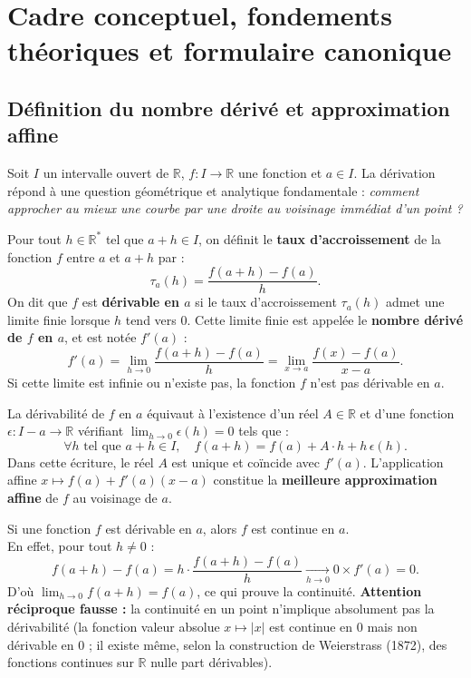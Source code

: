 \documentclass[11pt,a4paper]{article}
\newcommand{\R}{\mathbb{R}}
\begin{document}
\section{Cadre conceptuel, fondements théoriques et formulaire canonique}

\subsection{Définition du nombre dérivé et approximation affine}

Soit $I$ un intervalle ouvert de $\R$, $f : I \to \R$ une fonction et $a \in I$.
La dérivation répond à une question géométrique et analytique fondamentale : \emph{comment approcher au mieux une courbe par une droite au voisinage immédiat d'un point ?}

\begin{theoremebox}
Pour tout $h \in \R^*$ tel que $a+h \in I$, on définit le \textbf{taux d'accroissement} de la fonction $f$ entre $a$ et $a+h$ par :
\[
\tau_a(h) = \frac{f(a+h) - f(a)}{h}.
\]
On dit que $f$ est \textbf{dérivable en $a$} si le taux d'accroissement $\tau_a(h)$ admet une limite finie lorsque $h$ tend vers $0$.
Cette limite finie est appelée le \textbf{nombre dérivé de $f$ en $a$}, et est notée $f'(a)$ :
\[
f'(a) = \lim_{h \to 0} \frac{f(a+h) - f(a)}{h} = \lim_{x \to a} \frac{f(x) - f(a)}{x - a}.
\]
Si cette limite est infinie ou n'existe pas, la fonction $f$ n'est pas dérivable en $a$.
\end{theoremebox}

\begin{theoremebox}
La dérivabilité de $f$ en $a$ équivaut à l'existence d'un réel $A \in \R$ et d'une fonction $\epsilon : I - a \to \R$ vérifiant $\lim_{h \to 0} \epsilon(h) = 0$ tels que :
\[
\forall h \text{ tel que } a+h \in I, \quad f(a+h) = f(a) + A \cdot h + h\,\epsilon(h).
\]
Dans cette écriture, le réel $A$ est unique et coïncide avec $f'(a)$.
L'application affine $x \mapsto f(a) + f'(a)(x-a)$ constitue la \textbf{meilleure approximation affine} de $f$ au voisinage de $a$.
\end{theoremebox}

\begin{remarquabox}
Si une fonction $f$ est dérivable en $a$, alors $f$ est continue en $a$.\\
En effet, pour tout $h \neq 0$ :
\[
f(a+h) - f(a) = h \cdot \frac{f(a+h) - f(a)}{h} \xrightarrow[h \to 0]{} 0 \times f'(a) = 0.
\]
D'où $\lim_{h \to 0} f(a+h) = f(a)$, ce qui prouve la continuité.
\textbf{Attention réciproque fausse :} la continuité en un point n'implique absolument pas la dérivabilité (la fonction valeur absolue $x \mapsto |x|$ est continue en $0$ mais non dérivable en $0$ ; il existe même, selon la construction de Weierstrass (1872), des fonctions continues sur $\R$ nulle part dérivables).
\end{remarquabox}
\end{document}
